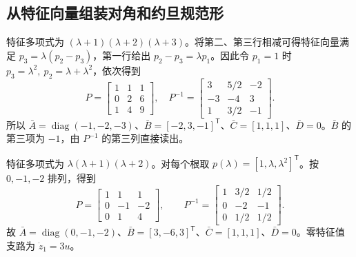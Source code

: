 \subsection{从特征向量组装对角和约旦规范形}



\sol 特征多项式为 $(\lambda+1)(\lambda+2)(\lambda+3)$。将第二、第三行相减可得特征向量满足 $p_3=\lambda(p_2-p_3)$，第一行给出 $p_2-p_3=\lambda p_1$。因此令 $p_1=1$ 时 $p_3=\lambda^2,\ p_2=\lambda+\lambda^2$，依次得到
\[
P=\begin{bmatrix}1&1&1\\0&2&6\\1&4&9\end{bmatrix},\quad
P^{-1}=\begin{bmatrix}3&5/2&-2\\-3&-4&3\\1&3/2&-1\end{bmatrix}.
\]
所以 $\bar A=\operatorname{diag}(-1,-2,-3)$、$\bar B=[-2,3,-1]^{\mathsf T}$、$\bar C=[1,1,1]$、$\bar D=0$。$\bar B$ 的第三项为 $-1$，由 $P^{-1}$ 的第三列直接读出。



\sol 特征多项式为 $\lambda(\lambda+1)(\lambda+2)$。对每个根取 $p(\lambda)=[1,\lambda,\lambda^2]^{\mathsf T}$。按 $0,-1,-2$ 排列，得到
\[
P=\begin{bmatrix}1&1&1\\0&-1&-2\\0&1&4\end{bmatrix},\qquad
P^{-1}=\begin{bmatrix}1&3/2&1/2\\0&-2&-1\\0&1/2&1/2\end{bmatrix}.
\]
故 $\bar A=\operatorname{diag}(0,-1,-2)$、$\bar B=[3,-6,3]^{\mathsf T}$、$\bar C=[1,1,1]$、$\bar D=0$。零特征值支路为 $\dot z_1=3u$。

